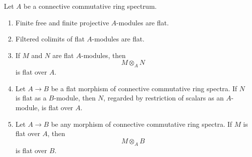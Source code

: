 \begin{proposition}
\label{prop:flat-module-permanence}
Let $A$ be a connective commutative ring spectrum.
\begin{enumerate}[label=(\roman*)]
    \item Finite free and finite projective $A$-modules are flat.

    \item Filtered colimits of flat $A$-modules are flat.

    \item If $M$ and $N$ are flat $A$-modules, then
    \[
        M\otimes_A N
    \]
    is flat over $A$.

    \item Let $A\to B$ be a flat morphism of connective commutative ring
    spectra. If $N$ is flat as a $B$-module, then $N$, regarded by
    restriction of scalars as an $A$-module, is flat over $A$.

    \item Let $A\to B$ be any morphism of connective commutative ring
    spectra. If $M$ is flat over $A$, then
    \[
        M\otimes_A B
    \]
    is flat over $B$.
\end{enumerate}
\end{proposition}

